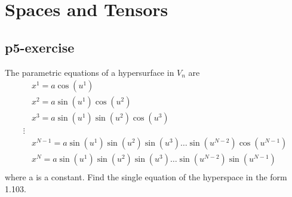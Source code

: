 \chapter{Spaces and Tensors}
\pagebreak[4]

\section{p5-exercise}

\begin{tcolorbox}

The parametric equations of a hypersurface in $V_n$ are
\begin{align*} 
\ &x^1 = a \cos(u^1)\\
\ &x^2 = a \sin(u^1)\cos(u^2)\\
\ &x^3 = a \sin(u^1)\sin(u^2)\cos(u^3)\\
\vdots\\
\ &x^{N-1} = a \sin(u^1)\sin(u^2)\sin(u^3)\dots\sin(u^{N-2})\cos(u^{N-1})\\
\ &x^{N} = a \sin(u^1)\sin(u^2)\sin(u^3)\dots\sin(u^{N-2})\sin(u^{N-1})\\
\end{align*}
where a is a constant. Find the single equation of the hyperspace in the form 1.103.

\end{tcolorbox}

